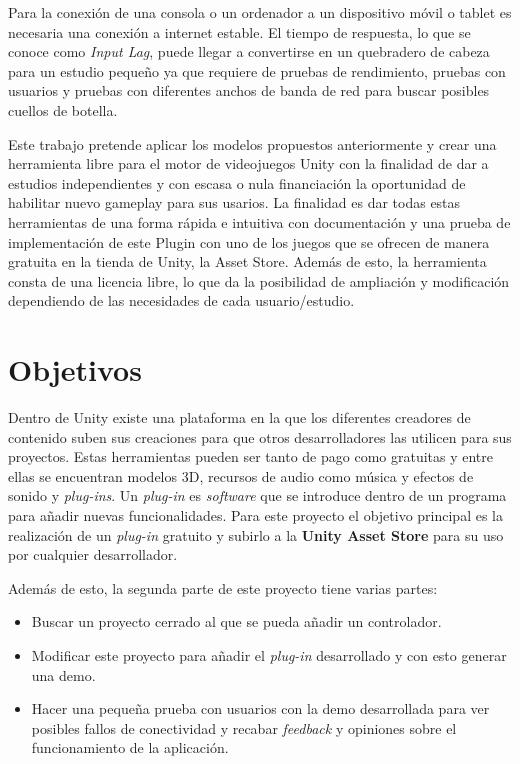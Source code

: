 Para la conexi\'on de una consola o un ordenador a un dispositivo m\'ovil o tablet es necesaria una conexi\'on a internet estable. El tiempo de respuesta, lo que se conoce como  \textit{Input Lag}, puede llegar a convertirse en un quebradero de cabeza para un estudio peque\~no ya que requiere de pruebas de rendimiento, pruebas con usuarios y pruebas con diferentes anchos de banda de red para buscar posibles cuellos de botella. 

Este trabajo pretende aplicar los modelos propuestos anteriormente y crear una herramienta libre para el motor de videojuegos Unity con la finalidad de dar a estudios independientes y con escasa o nula financiaci\'on la oportunidad de habilitar nuevo gameplay para sus usarios. La finalidad es dar todas estas herramientas de una forma r\'apida e intuitiva con documentaci\'on y una prueba de implementaci\'on de este Plugin con uno de los juegos que se ofrecen de manera gratuita en la tienda de Unity, la Asset Store. Adem\'as de esto, la herramienta consta de una licencia libre, lo que da la posibilidad de ampliaci\'on y modificaci\'on dependiendo de las necesidades de cada usuario/estudio.

\section{Objetivos}

Dentro de Unity existe una plataforma  en la que los diferentes creadores de contenido suben sus creaciones para que otros desarrolladores las utilicen para sus proyectos. Estas herramientas pueden ser tanto de pago como gratuitas y entre ellas se encuentran modelos 3D, recursos de audio como m\'usica y efectos de sonido y \textit{plug-ins}. Un \textit{plug-in} es \textit{software} que se introduce dentro de un programa para a\~nadir nuevas funcionalidades. Para este proyecto el objetivo principal es la realizaci\'on de un \textit{plug-in} gratuito y subirlo a la \textbf{Unity Asset Store} para su uso por cualquier desarrollador. 

Adem\'as de esto, la segunda parte de este proyecto tiene varias partes:

\begin {itemize}
\item Buscar un proyecto cerrado al que se pueda a\~nadir un controlador.
\item Modificar este proyecto para a\~nadir el \textit{plug-in} desarrollado y con esto generar una demo.
\item Hacer una peque\~na prueba con usuarios con la demo desarrollada para ver posibles fallos de conectividad y recabar \textit{feedback} y opiniones sobre el funcionamiento de la aplicaci\'on.
\end {itemize}

